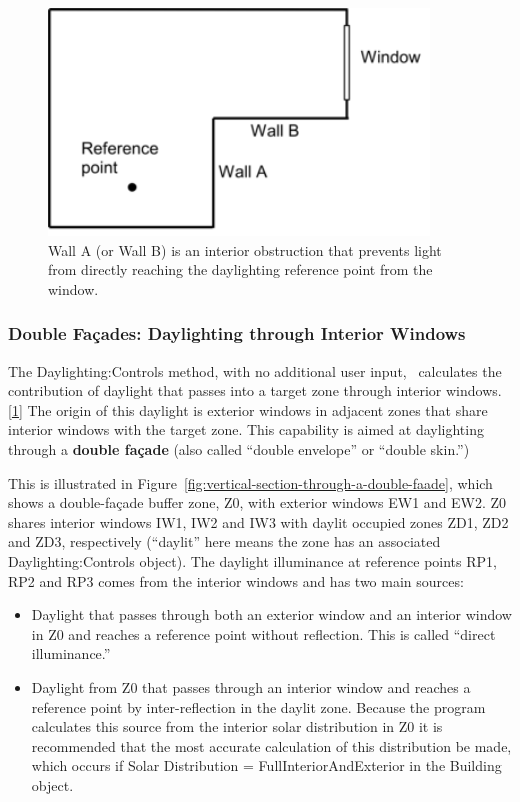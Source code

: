 \begin{figure}[hbtp] %
\centering
\includegraphics[width=0.9\textwidth, height=0.9\textheight, keepaspectratio=true]{media/image101.png}
\caption{Wall A (or Wall B) is an interior obstruction that prevents light from directly reaching the daylighting reference point from the window. \protect \label{fig:wall-a-or-wall-b-is-an-interior-obstruction}}
\end{figure}

\subsubsection{Double Façades: Daylighting through Interior Windows}\label{double-fauxe7ades-daylighting-through-interior-windows}

The Daylighting:Controls method, with no additional user input,~ calculates the contribution of daylight that passes into a target zone through interior windows.\protect\hyperlink{ux5fftn1}{{[}1{]}} The origin of this daylight is exterior windows in adjacent zones that share interior windows with the target zone. This capability is aimed at daylighting through a \textbf{double façade} (also called ``double envelope'' or ``double skin.'')

This is illustrated in Figure~\ref{fig:vertical-section-through-a-double-faade}, which shows a double-façade buffer zone, Z0, with exterior windows EW1 and EW2. Z0 shares interior windows IW1, IW2 and IW3 with daylit occupied zones ZD1, ZD2 and ZD3, respectively (``daylit'' here means the zone has an associated Daylighting:Controls object). The daylight illuminance at reference points RP1, RP2 and RP3 comes from the interior windows and has two main sources:

\begin{itemize}
  \item
    Daylight that passes through both an exterior window and an interior window in Z0 and reaches a reference point without reflection. This is called ``direct illuminance.''
  \item
    Daylight from Z0 that passes through an interior window and reaches a reference point by inter-reflection in the daylit zone. Because the program calculates this source from the interior solar distribution in Z0 it is recommended that the most accurate calculation of this distribution be made, which occurs if Solar Distribution = FullInteriorAndExterior in the Building object.
\end{itemize}

